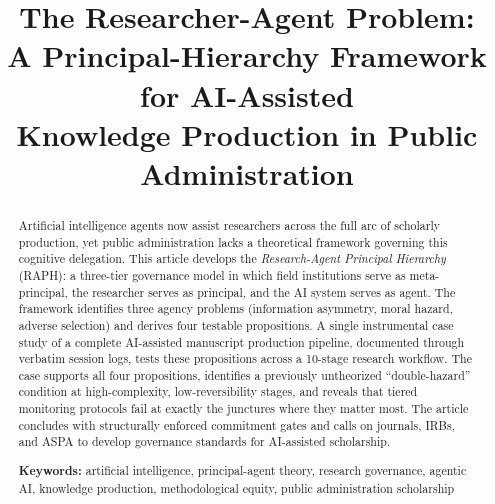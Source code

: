 \documentclass[12pt]{article}
\title{\textbf{The Researcher-Agent Problem: \\
A Principal-Hierarchy Framework for AI-Assisted \\
Knowledge Production in Public Administration}}
\date{}
\author{}   %
\begin{document}
\maketitle
\thispagestyle{empty}

\begin{abstract}
\noindent
Artificial intelligence agents now assist researchers across the full arc of scholarly
production, yet public administration lacks a theoretical framework governing this
cognitive delegation. This article develops the \emph{Research-Agent Principal Hierarchy}
(RAPH): a three-tier governance model in which field institutions serve as meta-principal,
the researcher serves as principal, and the AI system serves as agent. The framework
identifies three agency problems (information asymmetry, moral hazard, adverse selection)
and derives four testable propositions. A single instrumental case study of a complete
AI-assisted manuscript production pipeline, documented through verbatim session logs,
tests these propositions across a 10-stage research workflow. The case supports all four
propositions, identifies a previously untheorized ``double-hazard'' condition at
high-complexity, low-reversibility stages, and reveals that tiered monitoring protocols
fail at exactly the junctures where they matter most. The article concludes with
structurally enforced commitment gates and calls on journals, IRBs, and ASPA to develop
governance standards for AI-assisted scholarship.

\bigskip
\noindent\textbf{Keywords:} artificial intelligence, principal-agent theory, research governance,
agentic AI, knowledge production, methodological equity, public administration scholarship
\end{abstract}

\newpage
\end{document}
